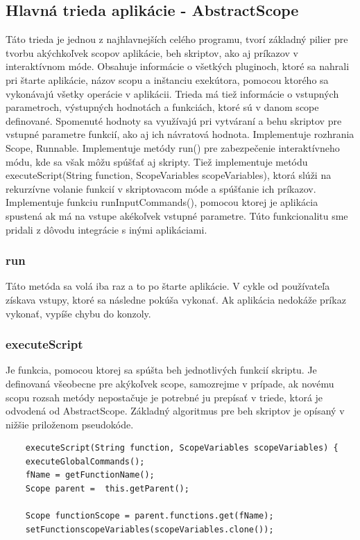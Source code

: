 {\subsection{Hlavná trieda aplikácie - AbstractScope}
Táto trieda je jednou z najhlavnejších celého programu, tvorí základný pilier pre tvorbu akýchkoľvek scopov aplikácie, beh skriptov, ako aj príkazov v interaktívnom móde. Obsahuje informácie o všetkých pluginoch, ktoré sa nahrali pri štarte aplikácie, názov scopu a inštanciu exekútora, pomocou ktorého sa vykonávajú všetky operácie v aplikácii. Trieda má tiež informácie o vstupných parametroch, výstupných hodnotách a funkciách, ktoré sú v danom scope definované. Spomenuté hodnoty sa využívajú pri vytváraní a behu skriptov pre vstupné parametre funkcií, ako aj ich návratová hodnota. Implementuje rozhrania Scope, Runnable. Implementuje metódy run() pre zabezpečenie interaktívneho módu, kde sa však môžu spúšťať aj skripty. Tiež implementuje metódu executeScript(String function, ScopeVariables scopeVariables), ktorá slúži na rekurzívne volanie funkcií v skriptovacom móde a spúšťanie ich príkazov.
Implementuje funkciu runInputCommands(), pomocou ktorej je aplikácia spustená ak má na vstupe akékoľvek vstupné parametre. Túto funkcionalitu sme pridali z dôvodu integrácie s inými aplikáciami. 
\subsubsection{run}
\indent Táto metóda sa volá iba raz a to po štarte aplikácie. V cykle od používateľa získava vstupy, ktoré sa následne pokúša vykonať. Ak aplikácia nedokáže príkaz vykonať, vypíše chybu do konzoly.
\subsubsection{executeScript}
\indent Je funkcia, pomocou ktorej sa spúšta beh jednotlivých funkcií skriptu. Je definovaná všeobecne pre akýkoľvek scope, samozrejme v prípade, ak novému scopu rozsah metódy nepostačuje je potrebné ju prepísať v triede, ktorá je odvodená od AbstractScope. Základný algoritmus pre beh skriptov je opísaný v nižšie priloženom pseudokóde.
\begin{algorithm}[H]
	\begin{verbatim}
	executeScript(String function, ScopeVariables scopeVariables) {
	executeGlobalCommands();
	fName = getFunctionName();
	Scope parent =  this.getParent();
	
	Scope functionScope = parent.functions.get(fName);
	setFunctionscopeVariables(scopeVariables.clone());
	

\end{verbatim}
\end{algorithm}}
